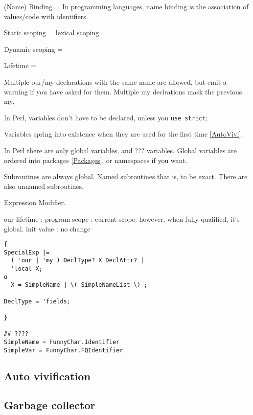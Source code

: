 \documentclass{article}
\begin{document}
\begin{description}
(Name) Binding = In programming languages, name binding is the association of
values/code with identifiers.

  Static scoping = lexical scoping

  Dynamic scoping =

Lifetime =

Multiple our/my declarations with the same name are allowed, but emit a warning if
you have asked for them. Multiple my declrations mask the previous my.

In Perl, variables don't have to be declared, unless you \verb|use strict|;

Variables spring into existence when they are used for the first time
\ref{AutoVivi}.

In Perl there are only global variables, and ??? variables. Global variables are
ordered into packages \ref{Packages}, or namespaces if you want. 

Subroutines are always global. Named subroutines that is, to be exact. There are
also unnamed subroutines.

Expression Modifier.


our
  lifetime : program
  scope : current scope. however, when fully qualified, it's global.
  init value : no change

\begin{verbatim}
{
SpecialExp |=
  ( 'our | 'my ) DeclType? X DeclAttr? |
  'local X;
o
  X = SimpleName | \( SimpleNameList \) ;

DeclType = 'fields;

} 

## ????
SimpleName = FunnyChar.Identifier
SimpleVar = FunnyChar.FQIdentifier

\end{verbatim}

\subsection{Auto vivification}

\subsection{Garbage collector}


\end{description}
\end{document}
